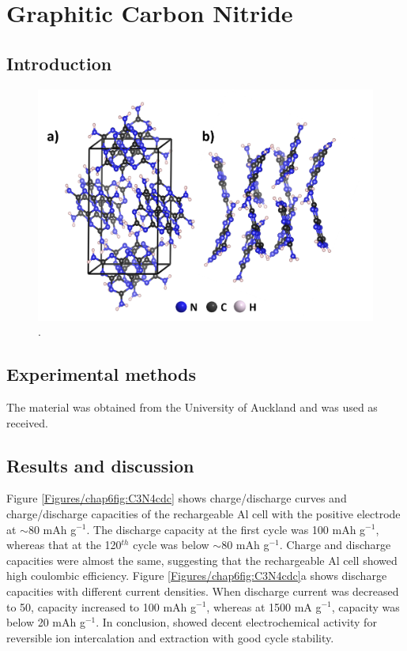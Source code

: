 \section{Graphitic Carbon Nitride}

\subsection{Introduction}

\begin{figure}[th!]
\centering
\includegraphics[width=\textwidth]{Figures/chap6fig/C3N4crys}
\caption{.}
\label{Figures/chap6fig:C3N4crys}
\end{figure}
\subsection{Experimental methods}
The material was obtained from the University of Auckland and was used as received. 

\subsection{Results and discussion}
Figure \ref{Figures/chap6fig:C3N4cdc} shows charge/discharge curves and charge/discharge capacities of the rechargeable Al cell with the  positive electrode at $\sim$80 mAh g$^{-1}$. The discharge capacity at the first cycle was 100 mAh g$^{-1}$, whereas that at the 120$^{th}$ cycle was below $\sim$80 mAh g$^{-1}$. Charge and discharge capacities were almost the same, suggesting that the rechargeable Al cell showed high coulombic efficiency. Figure \ref{Figures/chap6fig:C3N4cdc}a shows discharge capacities with different current densities. When discharge current was decreased to 50, capacity increased to 100 mAh g$^{-1}$, whereas at 1500 mA g$^{-1}$, capacity was below 20 mAh g$^{-1}$. In conclusion,  showed decent electrochemical activity for reversible ion intercalation and extraction with good cycle stability. 

